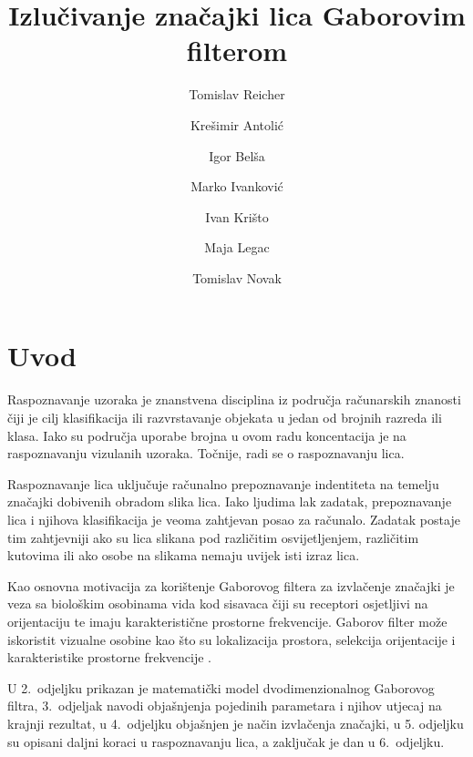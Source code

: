 \documentclass{article}
\begin{document}
\title{Izlučivanje značajki lica Gaborovim filterom}
\author{Tomislav Reicher \and Krešimir Antolić \and Igor Belša \and Marko Ivanković \and Ivan Krišto \and Maja Legac \and Tomislav Novak}

\maketitle

\tableofcontents

\section{Uvod}
Raspoznavanje uzoraka je znanstvena disciplina iz područja računarskih znanosti
čiji je cilj klasifikacija ili razvrstavanje objekata u jedan od brojnih razreda
ili klasa. Iako su područja uporabe brojna u ovom radu koncentacija je na
raspoznavanju vizulanih uzoraka. Točnije, radi se o raspoznavanju lica.

Raspoznavanje lica uključuje računalno prepoznavanje indentiteta na temelju
značajki dobivenih obradom slika lica. Iako ljudima lak zadatak, prepoznavanje
lica i njihova klasifikacija je veoma zahtjevan posao za računalo. Zadatak
postaje tim zahtjevniji ako su lica slikana pod različitim osvijetljenjem,
različitim kutovima ili ako osobe na slikama nemaju uvijek isti izraz lica.

Kao osnovna motivacija za korištenje Gaborovog filtera za izvlačenje značajki je
veza sa biološkim osobinama vida kod sisavaca čiji su receptori osjetljivi na
orijentaciju te imaju karakteristične prostorne frekvencije. Gaborov filter može
iskoristit vizualne osobine kao što su lokalizacija prostora, selekcija
orijentacije i karakteristike prostorne frekvencije
\citep{bhuiyan2007onfacerecognition}\nocite{daugman1985uncertainty}.

U 2.~odjeljku prikazan je matematički model dvodimenzionalnog Gaborovog filtra,
3.~odjeljak navodi objašnjenja pojedinih parametara i njihov utjecaj na krajnji rezultat, 
u 4.~odjeljku objašnjen je način izvlačenja značajki, 
u 5. odjeljku su opisani daljni koraci u raspoznavanju lica, a zaključak je dan u 6.~odjeljku.
\end{document}
